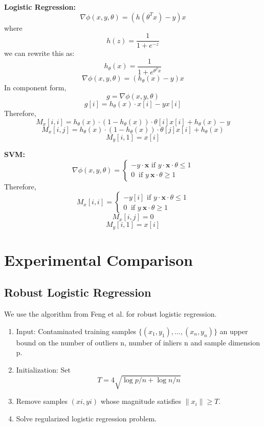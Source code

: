 \noindent\textbf{Logistic Regression: } 
\[
\nabla\phi(x,y,\theta) = (h(\theta^Tx) - y)x
\]
where
\[
h(z) = \frac{1}{1+e^{-z}}
\]
we can rewrite this as:
\[
h_{\theta}(x) = \frac{1}{1+e^{\theta^Tx}}
\]
\[
\nabla\phi(x,y,\theta) = (h_{\theta}(x) - y)x
\]
In component form,
\[
g = \nabla\phi(x,y,\theta)
\]
\[
g[i] = h_{\theta}(x)\cdot x[i] - yx[i]
\]
Therefore,
\[
M_x[i,i] = h_{\theta}(x)\cdot(1- h_{\theta}(x))\cdot \theta[i] x[i] + h_{\theta}(x) - y
\]
\[
M_x[i,j] = h_{\theta}(x)\cdot(1- h_{\theta}(x))\cdot \theta[j] x[i] + h_{\theta}(x)
\]
\[
M_y[i,1] = x[i] 
\]

\noindent\textbf{SVM: } 
\[
\nabla\phi(x,y,\theta) =
\begin{cases}      
-y\cdot\boldsymbol{x} \text{ if } y\cdot\boldsymbol{x}\cdot\theta \le 1 \\
0\ \text{ if } y\ \boldsymbol{x}\cdot\theta \geq 1      
\end{cases}
\]
Therefore,
\[
M_x[i,i] = \begin{cases}      
-y[i] \text{ if } y\cdot\boldsymbol{x}\cdot\theta \le 1 \\
0\ \text{ if } y\ \boldsymbol{x}\cdot\theta \geq 1      
\end{cases} 
\]
\[
M_x[i,j] = 0
\]
\[
M_y[i,1] = x[i] 
\]


\section{Experimental Comparison}
\subsection{Robust Logistic Regression}\label{rlogit}
We use the algorithm from Feng et al. for robust logistic regression.
\begin{enumerate}
\item Input: Contaminated training samples $\{(x_1, y_1), . . . ,(x_{n}
, y_{n})\}$ an upper bound on the number of outliers n, number of inliers n and sample dimension p.
\item Initialization: Set \[T = 4\sqrt{\log p/n + \log n/n}\]
\item Remove samples $(xi
, yi)$ whose magnitude satisfies $\|x_i\| \ge T$.
\item Solve regularized logistic regression problem.
\end{enumerate}

